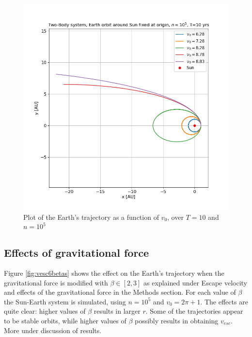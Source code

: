 \documentclass[%
oneside,                 %
final,                   %
10pt]{article}
\begin{document}
\begin{figure}[!htb]
        \centering 
         \includegraphics[scale=.5]{../Results/VescAllOnePlotnj5T10.png} 
        \caption{Plot of the Earth's trajectory as a function of $v_0$, over $T=10$ and $n=10^5$}
        \label{fig:esc_vel}   
\end{figure}  


\subsection{Effects of gravitational force}
Figure \ref{fig:vesc6betas} shows the effect on the Earth's trajectory when the gravitational force is modified with $\beta\in [2,3]$ as explained under Escape velocity and effects of the gravitational force in the Methods section. For each value of $\beta$ the Sun-Earth system is simulated, using $n=10^5$ and $v_0=2\pi +1$. The effects are quite clear: higher values of $\beta$ results in larger $r$. Some of the trajectories appear to be stable orbits, while higher values of $\beta$ possibly results in obtaining $v_{esc}$. More under discussion of results.
\end{document}

